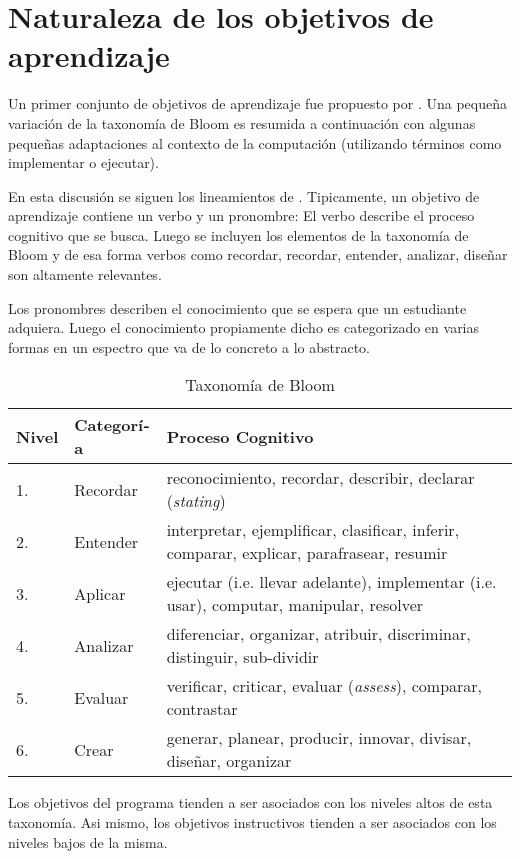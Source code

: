 \section{Naturaleza de los objetivos de aprendizaje}
Un primer conjunto de objetivos de aprendizaje fue propuesto por \cite{Bloom56Taxonomy}. 
Una pequeña variación de la taxonomí­a de Bloom es resumida a continuación con algunas 
pequeñas adaptaciones al contexto de la computación (utilizando términos como implementar o ejecutar).

En esta discusión se siguen los lineamientos de \cite{Anderson2001Bloom}. 
Tipicamente, un objetivo de aprendizaje contiene un verbo y un pronombre:
El verbo describe el proceso cognitivo que se busca. Luego se incluyen los 
elementos de la taxonomí­a de Bloom y de esa forma verbos como 
recordar, recordar, entender, analizar, diseñar son altamente relevantes.

Los pronombres describen el conocimiento que se espera que un estudiante adquiera. Luego el conocimiento 
propiamente dicho es categorizado en varias formas en un espectro que va de lo concreto a lo abstracto.

\begin{center}
\begin{table}[h!]
\begin{tabularx}{\textwidth}{|l|l|X|}\hline
\textbf{Nivel} & \textbf{Categorí­a}      & \textbf{Proceso Cognitivo} \\ \hline
1.     & Recordar 	& reconocimiento, recordar, describir, declarar (\textit{stating}) \\ \hline
2.     & Entender 	& interpretar, ejemplificar, clasificar, inferir, comparar, explicar, parafrasear, resumir \\ \hline
3.     & Aplicar        & ejecutar (i.e. llevar adelante), implementar (i.e. usar), computar, manipular, resolver \\ \hline
4.     & Analizar      	& diferenciar, organizar, atribuir, discriminar, distinguir, sub-dividir \\ \hline 
5.     & Evaluar     	& verificar, criticar, evaluar (\textit{assess}), comparar, contrastar \\ \hline
6.     & Crear       	& generar, planear, producir, innovar, divisar, diseñar, organizar \\ \hline
\end{tabularx}
\label{tab:BloomTaxonomy}
\caption{Taxonomí­a de Bloom}
\end{table}
\end{center}

Los objetivos del programa tienden a ser asociados con los niveles altos de esta taxonomí­a. Asi mismo, 
los objetivos instructivos tienden a ser asociados con los niveles bajos de la misma.


